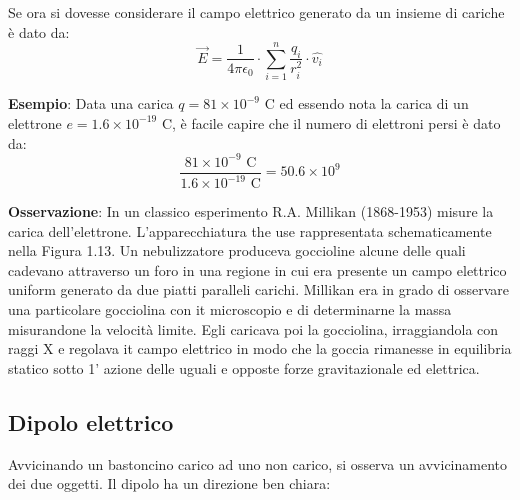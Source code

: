 \documentclass[a4paper]{extarticle}
\begin{document}
\vspace{1em}
\noindent
Se ora si dovesse considerare il campo elettrico generato da un insieme di cariche è dato da:
\[\boxed{\vec E = \frac{1}{4 \pi \epsilon_0} \cdot \sum_{i=1}^n \frac{q_i}{r_i^2} \cdot \hat{v_i}}\]

\vspace{1em}
\noindent
\textbf{Esempio}: Data una carica $q=81 \times 10^{-9}$ C ed essendo nota la carica di un elettrone $e = 1.6 \times 10^{-19}$ C, è facile capire che il numero di elettroni persi è dato da:
\[\frac{81 \times 10^{-9}\text{ C}}{1.6 \times 10^{-19}\text{ C}} = 50.6 \times 10^{9}\]

\vspace{1em}
\noindent
\textbf{Osservazione}: In un classico esperimento R.A. Millikan (1868-1953) misure la carica dell'elettrone. L'apparecchiatura the use rappresentata schematicamente nella Figura 1.13. Un nebulizzatore produceva goccioline alcune delle quali cadevano attraverso un foro in una regione in cui era presente un campo elettrico uniform generato da due piatti paralleli carichi. Millikan era in grado di osservare una particolare gocciolina con it microscopio e di determinarne la massa misurandone la velocità limite. Egli caricava poi la gocciolina, irraggiandola con raggi X e regolava it campo elettrico in modo che la goccia rimanesse in equilibria statico sotto 1' azione delle uguali e opposte forze gravitazionale ed elettrica.

\vspace{1em}
\noindent
\subsection{Dipolo elettrico}
Avvicinando un bastoncino carico ad uno non carico, si osserva un avvicinamento dei due oggetti. Il dipolo ha un direzione ben chiara:


    
    
\end{document}
